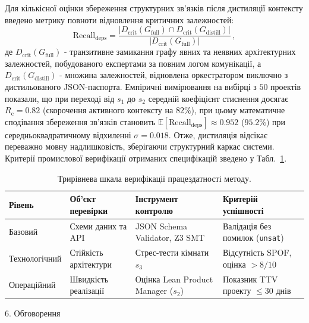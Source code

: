\documentclass[12pt, reqno, a4paper]{amsart}
\theoremstyle{definition}
\theoremstyle{plain}
\theoremstyle{plain}
\theoremstyle{plain}
\theoremstyle{remark}
\theoremstyle{plain}
\begin{document}
{Для кількісної оцінки збереження структурних зв'язків після дистиляції контексту введено метрику повноти відновлення критичних залежностей:
\begin{equation}
\label{eq:recall_deps}
\text{Recall}_{\text{deps}} = \frac{|D_{\text{crit}}(G_{\text{full}}) \cap D_{\text{crit}}(G_{\text{distill}})|}{|D_{\text{crit}}(G_{\text{full}})|}\, ,
\end{equation}
де $D_{\text{crit}}(G_{\text{full}})$ - транзитивне замикання графу явних та неявних архітектурних залежностей, побудованого експертами за повним логом комунікації, а $D_{\text{crit}}(G_{\text{distill}})$ - множина залежностей, відновлена оркестратором виключно з дистильованого JSON-паспорта. Емпіричні вимірювання на вибірці з $50$ проектів показали, що при переході від $s_1$ до $s_2$ середній коефіцієнт стиснення досягає $R_{\text{c}} = 0.82$ (скорочення активного контексту на $82\%$), при цьому математичне сподівання збереження зв'язків становить $\mathbb{E}[\text{Recall}_{\text{deps}}] \approx 0.952$ ($95.2\%$) при середньоквадратичному відхиленні $\sigma = 0.018$. Отже, дистиляція відсікає переважно мовну надлишковість, зберігаючи структурний каркас системи. Критерії промислової верифікації отриманих специфікацій зведено у Табл.~\ref{tab:verification}.

\begin{table}[htbp]
  \centering
  \caption{Трирівнева шкала верифікації працездатності методу.}
  \label{tab:verification}
  {\footnotesize
  \begin{tabular}{|p{2.4cm}|p{2.7cm}|p{3.1cm}|p{3.1cm}|}
  \hline
  \raggedright\textbf{Рівень} & \raggedright\textbf{Об'єкт перевірки} & \raggedright\textbf{Інструмент контролю} & \raggedright\textbf{Критерій успішності} \tabularnewline \hline
  \raggedright Базовий & \raggedright Схеми даних та API & \raggedright JSON Schema Validator, Z3 SMT & \raggedright Валідація без помилок (\texttt{unsat}) \tabularnewline \hline
  \raggedright Технологічний & \raggedright Стійкість архітектури & \raggedright Стрес-тести кімнати $s_3$ & \raggedright Відсутність SPOF, оцінка $> 8/10$ \tabularnewline \hline
  \raggedright Операційний & \raggedright Швидкість реалізації & \raggedright Оцінка Lean Product Manager ($s_2$) & \raggedright Показник TTV проекту $\le 30$ днів \tabularnewline \hline
  \end{tabular}
  }
\end{table}

\begin{Head}
6. Обговорення
\end{Head}

}
\end{document}
